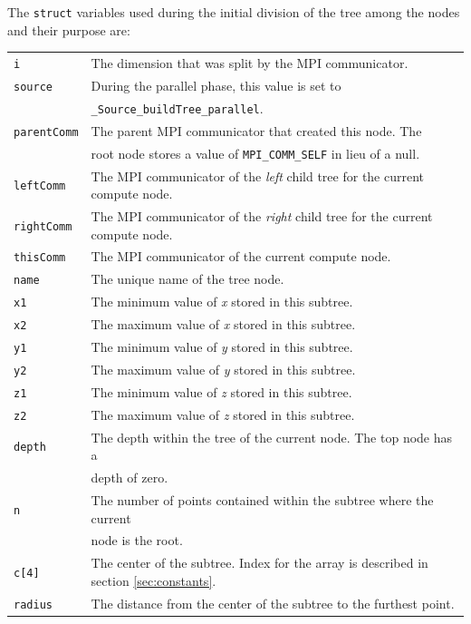\documentclass{article}
\begin{document}
The \texttt{struct} variables used during the initial division of the tree among the nodes and their purpose are: \\

\begin{tabular}{l l}
\texttt{i} & The dimension that was split by the MPI communicator.  \\
\texttt{source} & During the parallel phase, this value is set to  \\
& \texttt{\_Source\_buildTree\_parallel}.  \\
\texttt{parentComm} & The parent MPI communicator that created this node. The\\
&  root node stores a value of \texttt{MPI\_COMM\_SELF} in lieu of a null. \\
\texttt{leftComm} & The MPI communicator of the \textit{left} child tree for the current compute node.  \\
\texttt{rightComm} & The MPI communicator of the \textit{right} child tree for the current compute node.  \\
\texttt{thisComm} & The MPI communicator of the current compute node.  \\
\texttt{name} & The unique name of the tree node. \\
\texttt{x1} & The minimum value of \textit{x} stored in this subtree.  \\
\texttt{x2} & The maximum value of \textit{x} stored in this subtree.  \\
\texttt{y1} & The minimum value of \textit{y} stored in this subtree.  \\
\texttt{y2} & The maximum value of \textit{y} stored in this subtree.  \\
\texttt{z1} & The minimum value of \textit{z} stored in this subtree.  \\
\texttt{z2} & The maximum value of \textit{z} stored in this subtree.  \\
\texttt{depth} & The depth within the tree of the current node. The top node has a \\
& depth of zero.  \\
\texttt{n} & The number of points contained within the subtree where the current \\
& node is the root.  \\
\texttt{c[4]} & The center of the subtree. Index for the array is described in section \ref{sec:constants}. \\
\texttt{radius} & The distance from the center of the subtree to the furthest point.  \\
\end{tabular} \\
\end{document}
